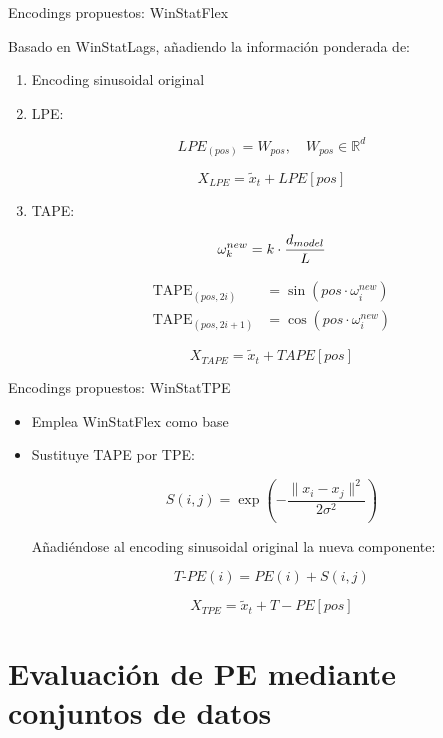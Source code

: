 \documentclass[compress]{beamer}
\begin{document}
	
	\begin{frame}{Encodings propuestos: WinStatFlex}
		
	Basado en WinStatLags, añadiendo la información ponderada de:
	\begin{enumerate}
	\item Encoding sinusoidal original
	\item LPE:
	
	$$
	LPE_{(pos)} = W_{pos}, \quad W_{pos} \in \mathbb{R}^d
	$$
	
	$$
	X_{LPE} = \tilde{x}_t + LPE[pos]
	$$
	
	\item TAPE:
	
	\begin{equation}
		\centering
		\omega^{new}_k = k \cdot \frac{d_{model}}{L}
	\end{equation}
	
	
	\begin{equation}
		\begin{aligned}
			\text{TAPE}_{(pos,2i)} &= \sin\!\left( pos \cdot \omega^{new}_i \right) \\
			\text{TAPE}_{(pos,2i+1)} &= \cos\!\left( pos \cdot \omega^{new}_i \right)
		\end{aligned}
	\end{equation}
	
	$$
	X_{TAPE} = \tilde{x}_t + TAPE[pos]
	$$
	
		\end{enumerate}
	\end{frame}
	
	\begin{frame}{Encodings propuestos: WinStatTPE}
	\begin{itemize}
		\item Emplea WinStatFlex como base
		\item Sustituye TAPE por TPE:
		
		$$S(i, j) = \exp\left( -\frac{\|x_i - x_j\|^2}{2\sigma^2} \right)$$
		
		Añadiéndose al encoding sinusoidal original la nueva componente:
		
		$$T\text{-}PE(i) = PE(i) + S(i, j)$$
		
		$$
		X_{TPE} = \tilde{x}_t + T-PE[pos]
		$$
		
		
	 \end{itemize}
	\end{frame}
	
	\section{Evaluación de PE mediante conjuntos de datos}
	
\end{document}
